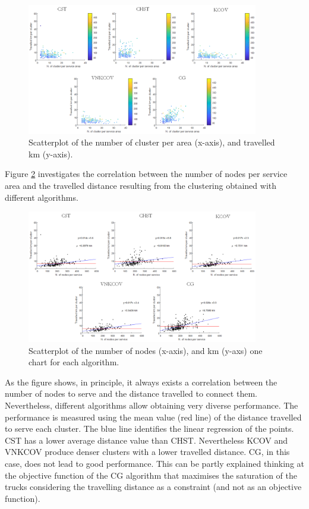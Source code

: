 \begin{figure}[hbt!]
\centering
\includegraphics[width=0.9\textwidth]{SectionDistribution/design_figures/fig_ROMA_bolle.png}
\captionsetup{type=figure}
\caption{Scatterplot of the number of cluster per area (x-axis), and travelled km (y-axis).}
\label{fig_ROMA_bolle}
\end{figure}

Figure \ref{fig_ROMA_rette} investigates the correlation between the number of nodes per service area and the travelled distance resulting from the clustering obtained with different algorithms. 

\begin{figure}[hbt!]
\centering
\includegraphics[width=0.9\textwidth]{SectionDistribution/design_figures/fig_ROMA_rette.png}
\captionsetup{type=figure}
\caption{Scatterplot of the number of nodes (x-axis), and km (y-axs) one chart for each algorithm.}
\label{fig_ROMA_rette}
\end{figure}

As the figure shows, in principle, it always exists a correlation between the number of nodes to serve and the distance travelled to connect them. Nevertheless, different algorithms allow obtaining very diverse performance. The performance is measured using the mean value (red line) of the distance travelled to serve each cluster. The blue line identifies the linear regression of the points. CST has a lower average distance value than CHST. Nevertheless KCOV and VNKCOV produce denser clusters with a lower travelled distance. CG, in this case, does not lead to good performance. This can be partly explained thinking at the objective function of the CG algorithm that maximises the saturation of the trucks considering the travelling distance as a constraint (and not as an objective function). \par

